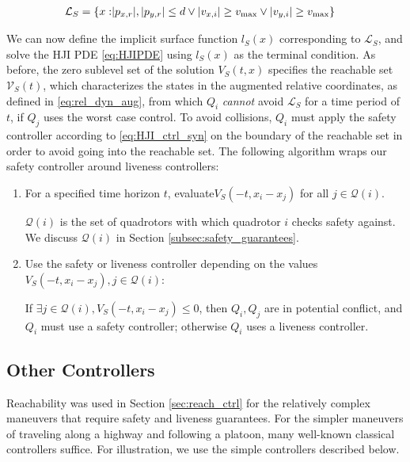 \begin{equation}
\begin{aligned}
\mathcal{L}_S = \{x: &|p_{x,r}|, |p_{y,r}|\le d \vee |v_{x,i}| \ge v_\text{max} \vee |v_{y,i}| \ge v_\text{max} \}
\end{aligned}
\end{equation}

We can now define the implicit surface function $l_S(x)$ corresponding to $\mathcal{L}_S$, and solve the HJI PDE \eqref{eq:HJIPDE} using $l_S(x)$ as the terminal condition. As before, the zero sublevel set of the solution $V_S(t,x)$ specifies the reachable set $\mathcal{V}_S(t)$, which characterizes the states in the augmented relative coordinates, as defined in \eqref{eq:rel_dyn_aug}, from which $Q_i$ \textit{cannot} avoid $\mathcal{L}_S$ for a time period of $t$, if $Q_j$ uses the worst case control. To avoid collisions, $Q_i$ must apply the safety controller according to \eqref{eq:HJI_ctrl_syn} on the boundary of the reachable set in order to avoid going into the reachable set. The following algorithm wraps our safety controller around liveness controllers:

\begin{enumerate}
\item For a specified time horizon $t$, evaluate$V_S(-t,x_i-x_j)$ for all $j\in \mathcal{Q}(i)$.

$\mathcal{Q}(i)$ is the set of quadrotors with which quadrotor $i$ checks safety against. We discuss $\mathcal{Q}(i)$ in Section \ref{subsec:safety_guarantees}.

\item Use the safety or liveness controller depending on the values $V_S(-t,x_i-x_j),j\in \mathcal{Q}(i)$: 

If $\exists j\in \mathcal{Q}(i),V_S(-t,x_i-x_j)\le 0$, then $Q_i,Q_j$ are in potential conflict, and $Q_i$ must use a safety controller; otherwise $Q_i$ uses a liveness controller.
\end{enumerate}

\subsection{Other Controllers \label{sec:other_ctrl}}
Reachability was used in Section \ref{sec:reach_ctrl} for the relatively complex maneuvers that require safety and liveness guarantees. For the simpler maneuvers of traveling along a highway and following a platoon, many well-known classical controllers suffice. For illustration, we use the simple controllers described below.

